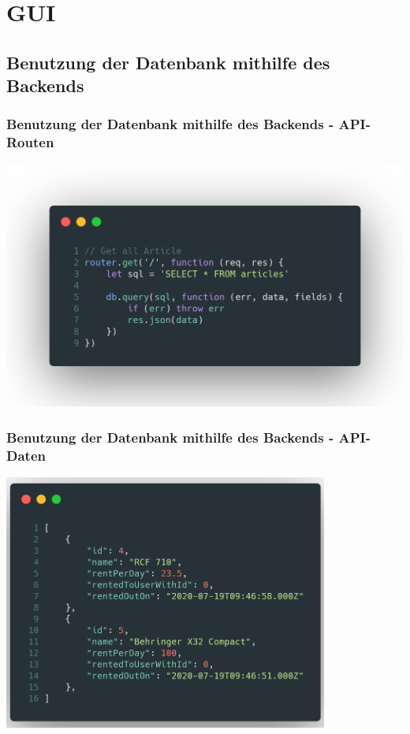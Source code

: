 \documentclass[aspectratio=169]{beamer}
\begin{document}
\section{GUI}
\subsection{Benutzung der Datenbank mithilfe des Backends}
\begin{frame}
	\frametitle{Benutzung der Datenbank mithilfe des Backends - API-Routen}
	\includegraphics[width=\textwidth]{presentation/image02}
\end{frame}

\begin{frame}
	\frametitle{Benutzung der Datenbank mithilfe des Backends - API-Daten}
	\center
	\includegraphics[width=0.8\textwidth]{presentation/image05}
\end{frame}
\end{document}
